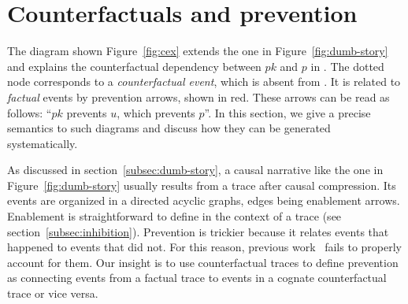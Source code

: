 
\section{Counterfactuals and prevention}\label{sec:inhibition}




The diagram shown Figure~\ref{fig:cex} extends the one in
Figure~\ref{fig:dumb-story} and explains the counterfactual dependency
between $pk$ and $p$ in \RefTrace{}. The dotted node corresponds to a
\emph{counterfactual event}, which is absent from \RefTrace{}. It is
related to \emph{factual} events by prevention arrows, shown in
red. These arrows can be read as follows: ``$pk$ prevents $u$, which
prevents $p$''. In this section, we give a precise semantics to such
diagrams and discuss how they can be generated systematically.

As discussed in section~\ref{subsec:dumb-story}, a causal narrative
like the one in Figure~\ref{fig:dumb-story} usually results from a
trace after causal compression.  Its events are organized in a
directed acyclic graphs, edges being enablement arrows. Enablement is
straightforward to define in the context of a trace (see
section~\ref{subsec:inhibition}). Prevention is trickier because it
relates events that happened to events that did not. For this reason,
previous work~\cite{DanosEtAl-CONCUR07,DBLP:conf/fsttcs/DanosFFHH12}
fails to properly account for them.  Our insight is to use
counterfactual traces to define prevention as connecting events from a
factual trace to events in a cognate counterfactual trace or vice
versa.


\ifshort \vspace{-0.4cm} \else \vspace{-0.3cm} \fi

